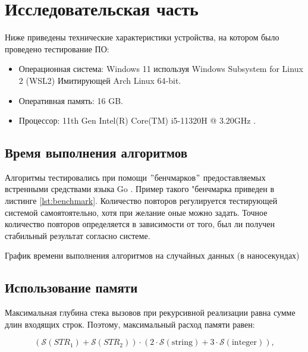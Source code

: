 \chapter{Исследовательская часть}
Ниже приведены технические характеристики устройства, на котором было проведено тестирование ПО:

\begin{itemize}
    \item Операционная система: Windows 11 используя Windows Subsystem for Linux 2 (WSL2) \cite{wsl2} Имитирующей Arch Linux \cite{arch} 64-bit.
    \item Оперативная память: 16 GB.
    \item Процессор: 11th Gen Intel(R) Core(TM) i5-11320H @ 3.20GHz \cite{i5}.
\end{itemize}

\section{Время выполнения алгоритмов}
Алгоритмы тестировались при помощи \("\)бенчмарков\("\) предоставляемых встренными средствами языка Go \cite{go}.
Пример такого "бенчмарка приведен в листинге \ref{lst:benchmark}.
Количество повторов регулируется тестирующей системой самоятоятельно, хотя при желание оные можно задать.
Точное количество повторов определяется в зависимости от того, был ли получен стабильный результат согласно системе.



График времени выполнения алгоритмов на случайных данных (в наносекундах)\newline
%
\section{Использование памяти}

Максимальная глубина стека вызовов при рекурсивной реализации равна сумме длин входящих строк. Поэтому, максимальный расход памяти равен:

\begin{equation}
(\mathcal{S}(STR_1) + \mathcal{S}(STR_2)) \cdot (2 \cdot \mathcal{S}\mathrm{(string)} + 3 \cdot \mathcal{S}\mathrm{(integer)}),
\end{equation}

